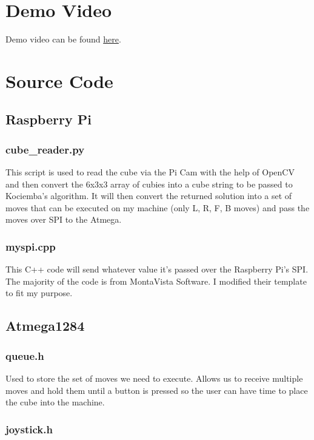 \section{Demo Video}

Demo video can be found \href{https://youtu.be/lqFNS5mc-u4}{here}.

\section{Source Code}
\label{sec:code}

\subsection{Raspberry Pi}

\subsubsection{cube\_reader.py}

This script is used to read the cube via the Pi Cam with the help of OpenCV and then convert the 6x3x3 array of cubies into a cube string to be passed to Kociemba’s algorithm. It will then convert the returned solution into a set of moves that can be executed on my machine (only L, R, F, B moves) and pass the moves over SPI to the Atmega.

\subsubsection{myspi.cpp}

This C++ code will send whatever value it's passed over the Raspberry Pi's SPI. The majority of the code is from MontaVista Software. I modified their template to fit my purpose.

\subsection{Atmega1284}

\subsubsection{queue.h}

Used to store the set of moves we need to execute. Allows us to receive multiple moves and hold them until a button is pressed so the user can have time to place the cube into the machine.

\subsubsection{joystick.h}

